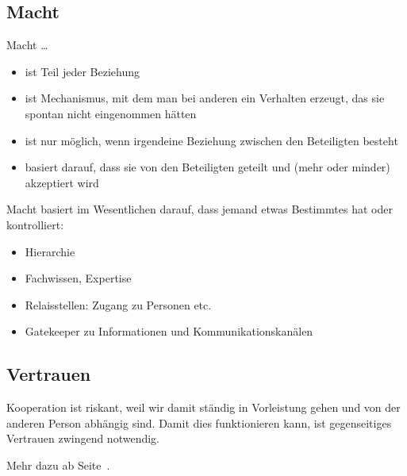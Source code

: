 \subsection{Macht}

Macht …

\begin{itemize}
    \item ist Teil jeder Beziehung
    \item ist Mechanismus, mit dem man bei anderen ein Verhalten erzeugt, das sie spontan nicht eingenommen hätten
    \item ist nur möglich, wenn irgendeine Beziehung zwischen den Beteiligten besteht
    \item basiert darauf, dass sie von den Beteiligten geteilt und (mehr oder minder) akzeptiert wird
\end{itemize}

Macht basiert im Wesentlichen darauf, dass jemand etwas Bestimmtes hat oder kontrolliert:

\begin{itemize}
    \item Hierarchie
    \item Fachwissen, Expertise
    \item Relaisstellen: Zugang zu Personen etc.
    \item Gatekeeper zu Informationen und Kommunikationskanälen
\end{itemize}

\subsection{Vertrauen}

Kooperation ist riskant, weil wir damit ständig in Vorleistung gehen und von der anderen Person abhängig sind. Damit dies funktionieren kann, ist gegenseitiges Vertrauen zwingend notwendig.

Mehr dazu ab Seite~\pageref{vertrauen-elemente}.
